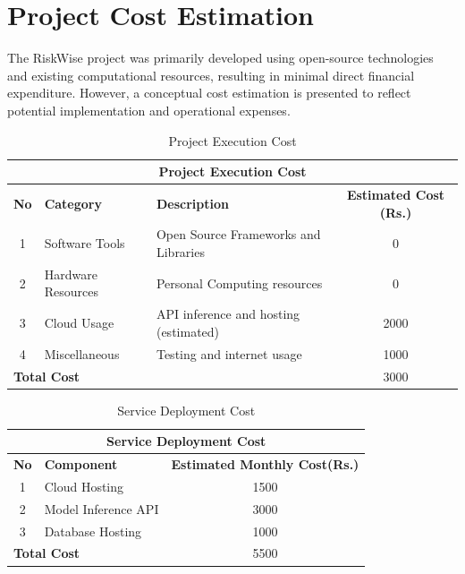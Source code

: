 \section{Project Cost Estimation}
The RiskWise project was primarily developed using open-source
technologies and existing computational resources, resulting in
minimal direct financial expenditure. However, a conceptual cost
estimation is presented to reflect potential implementation and
operational expenses.

\begin{table}[h]
  \centering
  \caption{Project Execution Cost}
  \begin{tabular}{|c|p{2.5cm}|p{4.5cm}|c|}
    \hline
    \multicolumn{4}{|c|}{\textbf{Project Execution Cost}} \\
    \hline
    \textbf{No}  & \textbf{Category} &  \textbf{Description} &
    \textbf{Estimated Cost (Rs.)}\\
    \hline
    1  & Software Tools & Open Source Frameworks and Libraries & 0 \\
    2  & Hardware Resources &  Personal Computing resources & 0 \\
    3  & Cloud Usage &  API inference and hosting (estimated) & 2000 \\
    4  & Miscellaneous & Testing and internet usage & 1000 \\
    \hline
    \multicolumn{3}{|l|}{\textbf{Total Cost}} & 3000\\
    \hline
  \end{tabular}%
  \label{tab:executioncost}%
\end{table}%

\begin{table}[h]
  \centering
  \caption{Service Deployment Cost}
  \begin{tabular}{|c|p{4.5cm}|c|}
    \hline
    \multicolumn{3}{|c|}{\textbf{Service Deployment Cost}} \\
    \hline
    \textbf{No}  & \textbf{Component} &  \textbf{Estimated Monthly Cost(Rs.)} \\
    \hline
    1  & Cloud Hosting & 1500 \\
    2  & Model Inference API &  3000 \\
    3  & Database Hosting & 1000 \\
    \hline
    \multicolumn{2}{|l|}{\textbf{Total Cost}} & 5500\\
    \hline
  \end{tabular}%
  \label{tab:costestimation}%
\end{table}%

